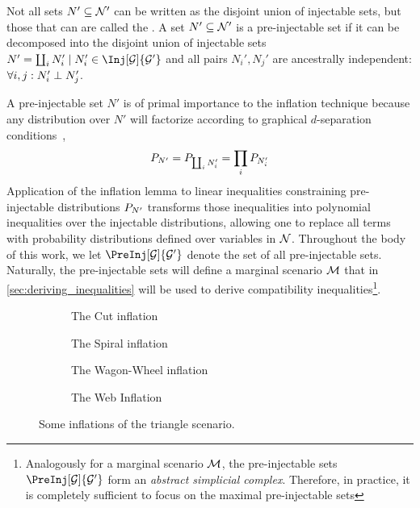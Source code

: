 \documentclass[aps, 10pt, english, twoside, pra, nofootinbib, tightenlines, longbibliography]{revtex4-1}
\begin{document}
    Not all sets $N' \subseteq \mathcal{N}'$ can be written as the disjoint union of injectable sets, but those that can are called the . A set $N' \subseteq \mathcal{N}'$ is a pre-injectable set if it can be decomposed into the disjoint union of injectable sets $N' = \coprod_{i} N'_i \mid N'_i \in \Inj[\graph]{\graph'}$ and all pairs $N_i', N_j'$ are ancestrally independent: $\forall i, j : N_i' \perp N_j'$.

    A pre-injectable set $N'$ is of primal importance to the inflation technique because any distribution over $N'$ will factorize according to graphical $d$-separation conditions~\cite{Pearl_2009},
    \[ \prob[N'] = \prob[\coprod_i N'_i] = \prod_{i}\prob[N'_i] \]
    Application of the inflation lemma to linear inequalities constraining pre-injectable distributions $\prob[N']$ transforms those inequalities into polynomial inequalities over the injectable distributions, allowing one to replace all terms with probability distributions defined over variables in $\mathcal{N}$. Throughout the body of this work, we let $\PreInj[\graph]{\graph'}$ denote the set of all pre-injectable sets. Naturally, the pre-injectable sets will define a marginal scenario $\mathcal{M}$ that in \cref{sec:deriving_inequalities} will be used to derive compatibility inequalities\footnote{Analogously for a marginal scenario $\mathcal{M}$, the pre-injectable sets $\PreInj[\graph]{\graph'}$ form an \textit{abstract simplicial complex}. Therefore, in practice, it is completely sufficient to focus on the maximal pre-injectable sets}.

    \begin{center}
    \begin{figure}
    \begin{subfigure}[b]{.45\linewidth}
    \scalebox{1}{}
    \caption{The Cut inflation}\label{fig:cut_inflation}
    \end{subfigure}
    \begin{subfigure}[b]{.45\linewidth}
    \scalebox{1}{}
    \caption{The Spiral inflation}\label{fig:spiral_inflation}
    \end{subfigure}

    \begin{subfigure}[b]{.45\linewidth}
    \scalebox{1.0}{}
    \caption{The Wagon-Wheel inflation}\label{fig:wagon_wheel_inflation}
    \end{subfigure}
    \begin{subfigure}[b]{.45\linewidth}
    \scalebox{1}{}
    \caption{The Web Inflation}\label{fig:the_web_inflation}
    \end{subfigure}
    \caption{Some inflations of the triangle scenario.}
    \label{fig:inflations}
    \end{figure}
    \end{center}
\end{document}
